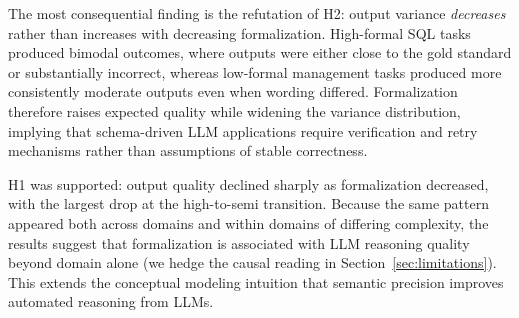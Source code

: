 \documentclass[runningheads]{llncs}
\begin{document}
The most consequential finding is the refutation of H2: output variance \textit{decreases} rather than increases with decreasing formalization. High-formal SQL tasks produced bimodal outcomes, where outputs were either close to the gold standard or substantially incorrect, whereas low-formal management tasks produced more consistently moderate outputs even when wording differed. Formalization therefore raises expected quality while widening the variance distribution, implying that schema-driven LLM applications require verification and retry mechanisms rather than assumptions of stable correctness.


H1 was supported: output quality declined sharply as formalization decreased, with the largest drop at the high-to-semi transition. Because the same pattern appeared both across domains and within domains of differing complexity, the results suggest that formalization is associated with LLM reasoning quality beyond domain alone (we hedge the causal reading in Section~\ref{sec:limitations}). This extends the conceptual modeling intuition that semantic precision improves automated reasoning from LLMs.


\end{document}
